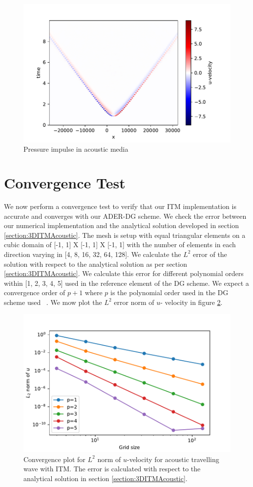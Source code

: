 \begin{figure}
    \centering
    \includegraphics[width=0.75\linewidth]{figures/pressureimpulsewave-noITM.pdf}
    \caption{Pressure impulse in acoustic media}
    \label{fig:space-timeplot-pressurenoITM}
\end{figure}

\section{Convergence Test}\label{sec:convergence}
We now perform a convergence test to verify that our \ac{ITM} implementation is accurate and converges with our \ac{ADER}-\ac{DG} scheme. 
We check the error between our numerical implementation and the analytical solution developed in section \ref{section:3DITMAcoustic}. 
The mesh is setup with equal triangular elements on a cubic domain of [-1, 1] X [-1, 1] X [-1, 1] with the number of elements in each direction varying in [4, 8, 16, 32, 64, 128].
We calculate the $L^2$ error of the solution with respect to the analytical solution as per section \ref{section:3DITMAcoustic}. We calculate this error for different polynomial
orders within [1, 2, 3, 4, 5] used in the reference element of the \ac{DG} scheme. We expect a convergence order of $p+1$ where $p$ is the polynomial order used in the
\ac{DG} scheme used ~\parencite{cockburn2011discontinuous}. We mow plot the $L^2$ error norm of $u$- velocity in figure \ref{fig:convergence}.

\begin{figure}
    \centering
    \includegraphics[width=0.75\linewidth]{figures/error1.pdf}
    \caption{Convergence plot for $L^2$ norm of $u$-velocity for acoustic travelling wave with \ac{ITM}. The error is calculated with respect to the analytical solution
    in section \ref{section:3DITMAcoustic}.}
    \label{fig:convergence}
\end{figure}

